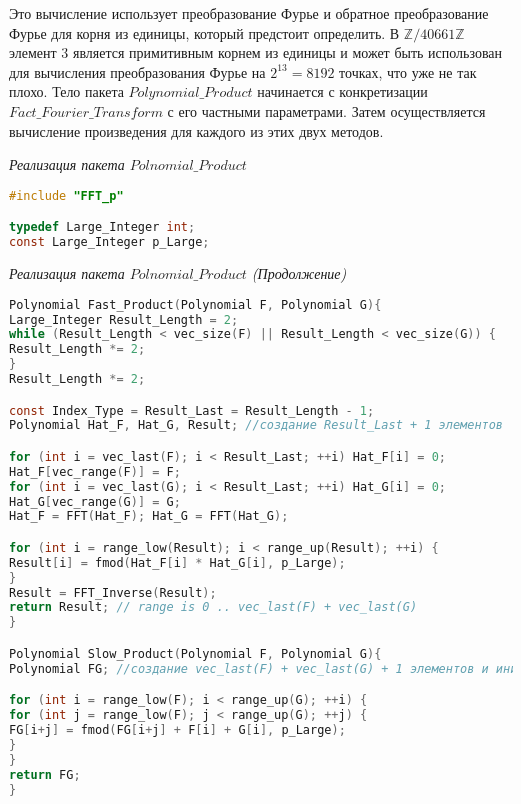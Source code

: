 \documentclass{mai_book}
\begin{document}
	
	\noindent Это вычисление использует преобразование Фурье и обратное преобразование Фурье для корня из единицы, который предстоит определить. В $\mathbb Z/40661\mathbb Z$ элемент 3 является примитивным корнем из единицы и может быть использован для вычисления преобразования Фурье на $2^{13} = 8192$ точках, что уже не так плохо. Тело пакета $Polynomial \_ Product$ начинается с конкретизации $Fact \_ Fourier \_ Transform$ с его частными параметрами. Затем осуществляется вычисление произведения для каждого из этих двух методов.
	
\textit{Реализация пакета $Polnomial \_ Product$}
	
\begin{lstlisting}[language=C,
basicstyle=\scriptsize,
linewidth=7cm,
belowskip=-1em,
mathescape=true]
#include "FFT_p"

typedef Large_Integer int;
const Large_Integer p_Large;
\end{lstlisting}	
	
	
	\newpage
	
   
\textit{Реализация пакета $Polnomial \_ Product$ (Продолжение)}
	
	\begin{lstlisting}[language=C,
basicstyle=\scriptsize,
linewidth=7cm,
belowskip=-1em,
mathescape=true]
Polynomial Fast_Product(Polynomial F, Polynomial G){
Large_Integer Result_Length = 2;
while (Result_Length < vec_size(F) || Result_Length < vec_size(G)) {
Result_Length *= 2;
}
Result_Length *= 2;

const Index_Type = Result_Last = Result_Length - 1;
Polynomial Hat_F, Hat_G, Result; //создание Result_Last + 1 элементов

for (int i = vec_last(F); i < Result_Last; ++i) Hat_F[i] = 0;
Hat_F[vec_range(F)] = F;
for (int i = vec_last(G); i < Result_Last; ++i) Hat_G[i] = 0;
Hat_G[vec_range(G)] = G;
Hat_F = FFT(Hat_F); Hat_G = FFT(Hat_G);

for (int i = range_low(Result); i < range_up(Result); ++i) {
Result[i] = fmod(Hat_F[i] * Hat_G[i], p_Large);
}
Result = FFT_Inverse(Result);
return Result; // range is 0 .. vec_last(F) + vec_last(G)
}

Polynomial Slow_Product(Polynomial F, Polynomial G){
Polynomial FG; //создание vec_last(F) + vec_last(G) + 1 элементов и инициализация 0

for (int i = range_low(F); i < range_up(G); ++i) {
for (int j = range_low(F); j < range_up(G); ++j) {
FG[i+j] = fmod(FG[i+j] + F[i] + G[i], p_Large);
}
}
return FG;
}
\end{lstlisting}
	
\end{document}
